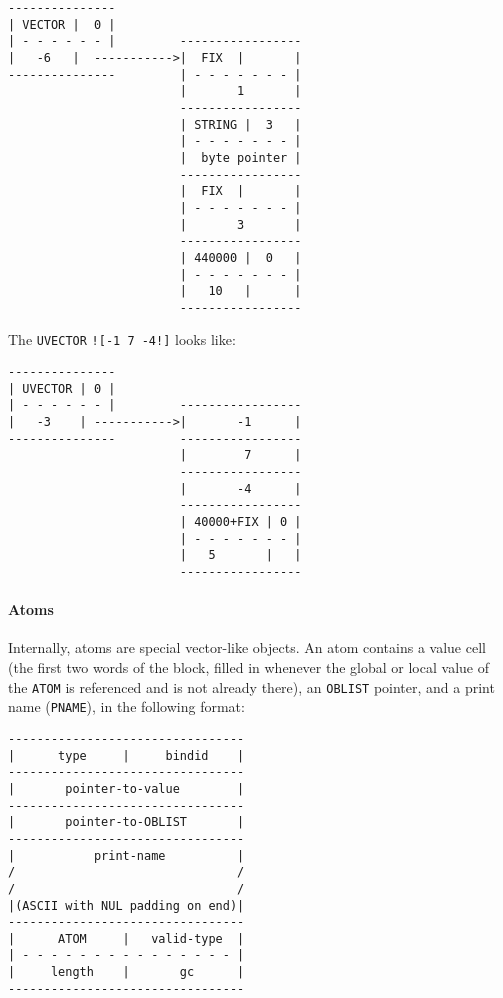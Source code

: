 \documentclass[a4paper,]{article}
\let\oldparagraph\paragraph
\renewcommand{\paragraph}[1]{\oldparagraph{#1}\mbox{}}
\begin{document}
\begin{verbatim}
---------------
| VECTOR |  0 |
| - - - - - - |         -----------------
|   -6   |  ----------->|  FIX  |       |
---------------         | - - - - - - - |
                        |       1       |
                        -----------------
                        | STRING |  3   |
                        | - - - - - - - |
                        |  byte pointer |
                        -----------------
                        |  FIX  |       |
                        | - - - - - - - |
                        |       3       |
                        -----------------
                        | 440000 |  0   |
                        | - - - - - - - |
                        |   10   |      |
                        -----------------
\end{verbatim}

The \texttt{UVECTOR} \texttt{!{[}-1\ 7\ -4!{]}} looks like:

\begin{verbatim}
---------------
| UVECTOR | 0 |
| - - - - - - |         -----------------
|   -3    | ----------->|       -1      |
---------------         -----------------
                        |        7      |
                        -----------------
                        |       -4      |
                        -----------------
                        | 40000+FIX | 0 |
                        | - - - - - - - |
                        |   5       |   |
                        -----------------
\end{verbatim}

\paragraph{Atoms}\label{atoms}

Internally, atoms are special vector-like objects. An atom contains a value cell (the first two words of the block, filled
in whenever the global or local value of the \texttt{ATOM} is referenced and is not already there), an \texttt{OBLIST}
pointer, and a print name (\texttt{PNAME}), in the following format:

\begin{verbatim}
---------------------------------
|      type     |     bindid    |
---------------------------------
|       pointer-to-value        |
---------------------------------
|       pointer-to-OBLIST       |
---------------------------------
|           print-name          |
/                               /
/                               /
|(ASCII with NUL padding on end)|
---------------------------------
|      ATOM     |   valid-type  |
| - - - - - - - - - - - - - - - |
|     length    |       gc      |
---------------------------------
\end{verbatim}
\end{document}
